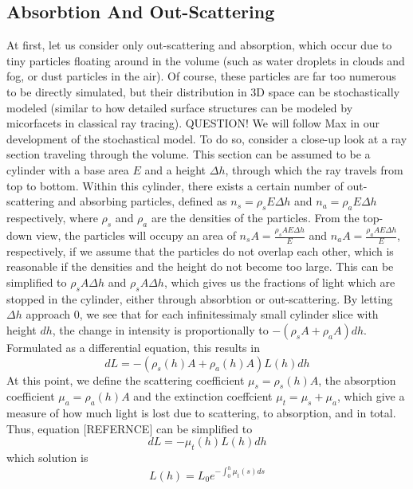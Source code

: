 \subsection{Absorbtion And Out-Scattering}
At first, let us consider only out-scattering and absorption, which occur due to tiny particles floating around in the volume (such as water droplets in clouds and fog, or dust particles in the air).
Of course, these particles are far too numerous to be directly simulated, but their distribution in 3D space can be stochastically modeled (similar to how detailed surface structures can be modeled by micorfacets in classical ray tracing).
QUESTION!
We will follow Max\cite{468400} in our development of the stochastical model.
To do so, consider a close-up look at a ray section traveling through the volume.
This section can be assumed to be a cylinder with a base area $E$ and a height $\Delta h$, through which the ray travels from top to bottom.
Within this cylinder, there exists a certain number of out-scattering and absorbing particles, defined as $n_s={\rho}_sE{\Delta}h$ and $n_a={\rho}_aE{\Delta}h$ respectively, where ${\rho}_s$ and ${\rho}_a$ are the densities of the particles.
From the top-down view, the particles will occupy an area of ${n_sA}=\frac{{\rho}_sAE{\Delta}h}{E}$ and ${n_aA}=\frac{{\rho}_aAE{\Delta}h}{E}$, respectively, if we assume that the particles do not overlap each other, which is reasonable if the densities and the height do not become too large.
This can be simplified to ${\rho}_sA{\Delta}h$ and ${\rho}_sA{\Delta}h$, which gives us the fractions of light which are stopped in the cylinder, either through absorbtion or out-scattering. By letting $\Delta h$ approach 0, we see that for each infinitessimaly small cylinder slice with height $dh$, the change in intensity is proportionally to $-({\rho}_sA + {\rho}_aA)dh$.
Formulated as a differential equation, this results in
\begin{equation}
dL = -({\rho}_s(h)A + {\rho}_a(h)A)L(h)dh
\end{equation}
At this point, we define the scattering coefficient ${\mu}_s ={\rho}_s(h)A $, the absorption coefficient ${\mu}_a = {\rho}_a(h)A$ and the extinction coeffcient ${\mu}_t = {\mu}_s +{\mu}_a$, which give a measure of how much light is lost due to scattering, to absorption, and in total. Thus, equation [REFERNCE] can be simplified to
\begin{equation}
dL = - {\mu}_t(h)L(h)dh
\end{equation}
which solution is
\begin{equation}
L(h) = L_0e^{-\int_{0}^{h} {\mu}_t(s)ds}
\end{equation}
